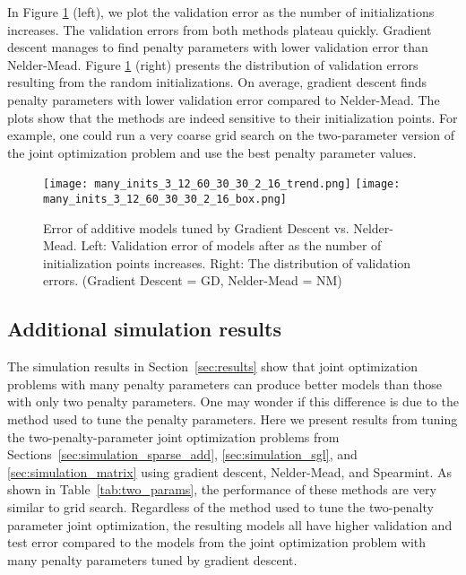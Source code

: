 \documentclass[12pt,letterpaper]{article}
\begin{document}
In Figure \ref{fig:mult_starts} (left), we plot the validation error as the number of initializations increases. The validation errors from both methods plateau quickly. Gradient descent manages to find penalty parameters with lower validation error than Nelder-Mead. Figure \ref{fig:mult_starts} (right) presents the distribution of validation errors resulting from the random initializations. On average, gradient descent finds penalty parameters with lower validation error compared to Nelder-Mead. The plots show that the methods are indeed sensitive to their initialization points. For example, one could run a very coarse grid search on the two-parameter version of the joint optimization problem and use the best penalty parameter values.

\begin{figure}
	\caption{\label{fig:mult_starts}
		Error of additive models tuned by Gradient Descent vs. Nelder-Mead. Left: Validation error of models after as the number of initialization points increases. Right: The distribution of validation errors. (Gradient Descent = GD, Nelder-Mead = NM)
	}
	\centering
	\texttt{[image: many\_inits\_3\_12\_60\_30\_30\_2\_16\_trend.png]}
	\texttt{[image: many\_inits\_3\_12\_60\_30\_30\_2\_16\_box.png]}
\end{figure}

\subsection{Additional simulation results}

The simulation results in Section~\ref{sec:results} show that joint optimization problems with many penalty parameters can produce better models than those with only two penalty parameters. One may wonder if this difference is due to the method used to tune the penalty parameters. Here we present results from tuning the two-penalty-parameter joint optimization problems from Sections~\ref{sec:simulation_sparse_add}, \ref{sec:simulation_sgl}, and \ref{sec:simulation_matrix} using gradient descent, Nelder-Mead, and Spearmint. As shown in Table~\ref{tab:two_params}, the performance of these methods are very similar to grid search. Regardless of the method used to tune the two-penalty parameter joint optimization, the resulting models all have higher validation and test error compared to the models from the joint optimization problem with many penalty parameters tuned by gradient descent.
\end{document}
